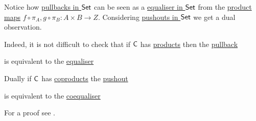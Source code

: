 \documentclass[../../main]{subfiles}
\begin{document}
\begin{remark}\label{rem:pullbacks-pushouts-as-equalisers-coequalisers}
  Notice how \hyperref[ex:pullback-Set]{pullbacks in \(\mathsf{Set}\)} can be seen as a \hyperref[ex:equaliser-Set]{equaliser in \(\mathsf{Set}\)} from the \hyperref[def:categorical-product]{product maps} \(f \circ \pi_{A}, g \circ \pi_{B}: A \times B \to Z\).
  Considering \hyperref[ex:pullback-Set]{pushouts in \(\mathsf{Set}\)} we get a dual observation.

  Indeed, it is not difficult to check that if \(\mathsf{C}\) has \hyperref[def:categorical-product]{products} then the \hyperref[def:pullback]{pullback}
  \begin{center}
  \end{center}
  is equivalent to the \hyperref[def:equaliser]{equaliser}
  \begin{center}
  \end{center}

  Dually if \(\mathsf{C}\) has \hyperref[def:categorical-coproduct]{coproducts} the \hyperref[def:pushout]{pushout}
  \begin{center}
  \end{center}
  is equivalent to the \hyperref[def:coequaliser]{coequaliser}
  \begin{center}
  \end{center}
  For a proof see \cite[Lemmas 3.4.16, 3.4.17]{riehlCategoryTheoryContext}.
\end{remark}
\end{document}
